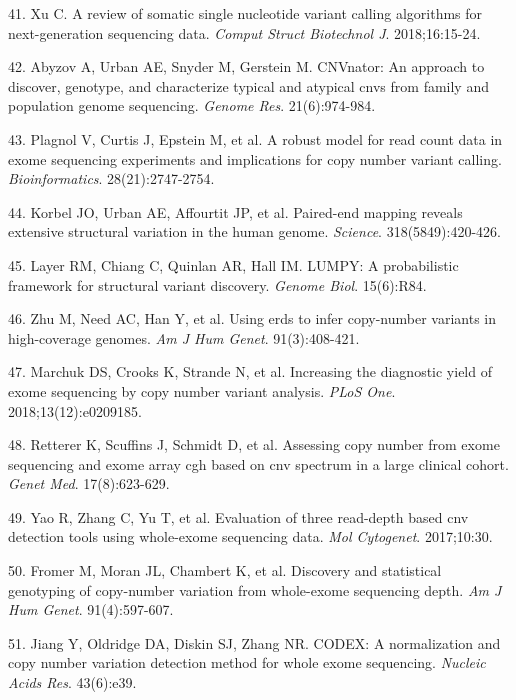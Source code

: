 \documentclass[11pt,letterpaper]{book}
\begin{document}
\leavevmode\hypertarget{ref-xu:2018aa}{}%
41. Xu C. A review of somatic single nucleotide variant calling algorithms for next-generation sequencing data. \emph{Comput Struct Biotechnol J}. 2018;16:15-24.

\leavevmode\hypertarget{ref-abyzov:2011aa}{}%
42. Abyzov A, Urban AE, Snyder M, Gerstein M. CNVnator: An approach to discover, genotype, and characterize typical and atypical cnvs from family and population genome sequencing. \emph{Genome Res}. 21(6):974-984.

\leavevmode\hypertarget{ref-plagnol:2012aa}{}%
43. Plagnol V, Curtis J, Epstein M, et al. A robust model for read count data in exome sequencing experiments and implications for copy number variant calling. \emph{Bioinformatics}. 28(21):2747-2754.

\leavevmode\hypertarget{ref-korbel:2007aa}{}%
44. Korbel JO, Urban AE, Affourtit JP, et al. Paired-end mapping reveals extensive structural variation in the human genome. \emph{Science}. 318(5849):420-426.

\leavevmode\hypertarget{ref-layer:2014aa}{}%
45. Layer RM, Chiang C, Quinlan AR, Hall IM. LUMPY: A probabilistic framework for structural variant discovery. \emph{Genome Biol}. 15(6):R84.

\leavevmode\hypertarget{ref-zhu:2012aa}{}%
46. Zhu M, Need AC, Han Y, et al. Using erds to infer copy-number variants in high-coverage genomes. \emph{Am J Hum Genet}. 91(3):408-421.

\leavevmode\hypertarget{ref-marchuk:2018aa}{}%
47. Marchuk DS, Crooks K, Strande N, et al. Increasing the diagnostic yield of exome sequencing by copy number variant analysis. \emph{PLoS One}. 2018;13(12):e0209185.

\leavevmode\hypertarget{ref-retterer:2015aa}{}%
48. Retterer K, Scuffins J, Schmidt D, et al. Assessing copy number from exome sequencing and exome array cgh based on cnv spectrum in a large clinical cohort. \emph{Genet Med}. 17(8):623-629.

\leavevmode\hypertarget{ref-yao:2017aa}{}%
49. Yao R, Zhang C, Yu T, et al. Evaluation of three read-depth based cnv detection tools using whole-exome sequencing data. \emph{Mol Cytogenet}. 2017;10:30.

\leavevmode\hypertarget{ref-fromer:2012aa}{}%
50. Fromer M, Moran JL, Chambert K, et al. Discovery and statistical genotyping of copy-number variation from whole-exome sequencing depth. \emph{Am J Hum Genet}. 91(4):597-607.

\leavevmode\hypertarget{ref-jiang:2015aa}{}%
51. Jiang Y, Oldridge DA, Diskin SJ, Zhang NR. CODEX: A normalization and copy number variation detection method for whole exome sequencing. \emph{Nucleic Acids Res}. 43(6):e39.
\end{document}
